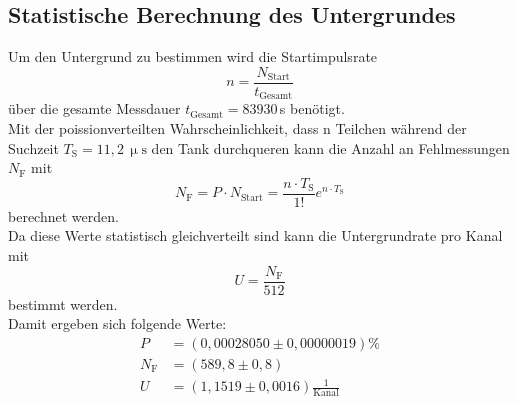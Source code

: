 \subsection{Statistische Berechnung des Untergrundes}
Um den Untergrund zu bestimmen wird die Startimpulsrate
\begin{equation}
  n=\frac{N_{\text{Start}}}{t_{\text{Gesamt}}}
\end{equation}
über die gesamte Messdauer $t_{\text{Gesamt}}= 83930$\,s benötigt.\\
Mit der poissionverteilten Wahrscheinlichkeit, dass n Teilchen während der Suchzeit $T_{\text{S}}=11,2\,\upmu\text{s}$ den Tank
durchqueren kann die Anzahl an Fehlmessungen $N_{\text{F}}$ mit
\begin{equation}
  N_{\text{F}}=P\cdot N_{\text{Start}}=\frac{n\cdot T_{\text{S}}}{1!}e^{n\cdot T_{\text{S}}}
\end{equation}
berechnet werden.\\
Da diese Werte statistisch gleichverteilt sind kann die Untergrundrate pro Kanal mit
 \begin{equation}
   U=\frac{N_{\text{F}}}{512}
 \end{equation}
bestimmt werden.\\
Damit ergeben sich folgende Werte:
\begin{align*}
  P&=(0,00028050\pm0,00000019)\%\\
  N_{\text{F}}&=(589,8\pm0,8)\\
  U&=(1,1519\pm0,0016)\frac{1}{\text{Kanal}}
\end{align*}
